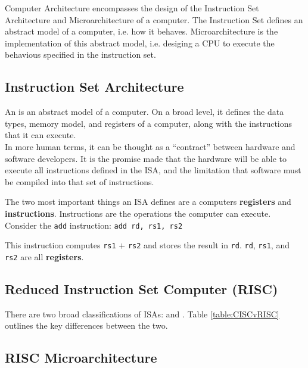 
Computer Architecture encompasses the design of the Instruction Set Architecture and Microarchitecture of a computer. The Instruction Set defines an abstract model of a computer, i.e. how it behaves. Microarchitecture is the implementation of this abstract model, i.e. desiging a CPU to execute the behavious specified in the instruction set.



\subsection{Instruction Set Architecture}
    An  is an abstract model of a computer. On a broad level, it defines the data types, memory model, and registers of a computer, along with the instructions that it can execute. \\
    In more human terms, it can be thought as a ``contract'' between hardware and software developers. It is the promise made that the hardware will be able to execute all instructions defined in the \gls{ISA}, and the limitation that software must be compiled into that set of instructions.

    

    The two most important things an \gls{ISA} defines are a computers \textbf{registers} and \textbf{instructions}. Instructions are the operations the computer can execute. Consider the \texttt{add} instruction: \texttt{add rd, rs1, rs2}

    This instruction computes \texttt{rs1} $+$ \texttt{rs2} and stores the result in \texttt{rd}.  \texttt{rd}, \texttt{rs1}, and \texttt{rs2} are all \textbf{registers}.
    
\subsection{Reduced Instruction Set Computer (RISC)}
    There are two broad classifications of \glspl{ISA}:  and . Table \ref{table:CISCvRISC} outlines the key differences between the two.

    

\subsection{RISC Microarchitecture}
    
